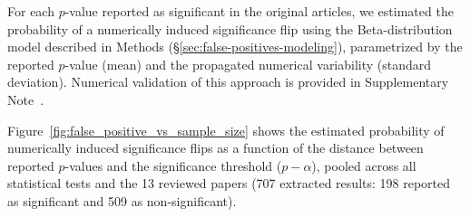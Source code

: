 For each $p$-value reported as significant in the original articles, we
estimated the probability of a numerically induced significance flip using
the Beta-distribution model described in Methods
(\S\ref{sec:false-positives-modeling}), parametrized by the reported
$p$-value (mean) and the propagated numerical variability (standard
deviation). Numerical validation of this approach is provided in
Supplementary
Note~.

Figure~\ref{fig:false_positive_vs_sample_size} shows the estimated probability
of numerically induced significance flips as a function of the distance between
reported $p$-values and the significance threshold ($p-\alpha$), pooled across
all statistical tests and the 13 reviewed papers (707 extracted results: 198
reported as significant and 509 as non-significant).

